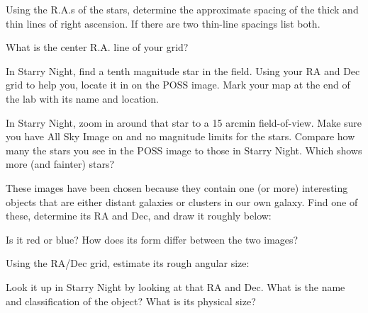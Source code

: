 \noindent Using the R.A.s of the stars, determine the approximate
spacing of the thick and thin lines of right ascension. If there are
two thin-line spacings list both.

\vspace{100pt}

\noindent What is the center R.A. line of your grid?

\vspace{100pt}

\noindent In Starry Night, find a tenth magnitude star in the
field. Using your RA and Dec grid to help you, locate it in on the
POSS image. Mark your map at the end of the lab with its name and
location.  

\noindent In Starry Night, zoom in around that star to a 15 arcmin
field-of-view.  Make sure you have All Sky Image on and no magnitude
limits for the stars. Compare how many the stars you see in the POSS
image to those in Starry Night. Which shows more (and fainter) stars?

\clearpage


\noindent These images have been chosen because they contain one (or
more) interesting objects that are either distant galaxies or clusters
in our own galaxy. Find one of these, determine its RA and Dec, and
draw it roughly below:

\vspace{100pt}

\noindent Is it red or blue? How does its form differ between the two
images? 

\vspace{80pt}

\noindent Using the RA/Dec grid, estimate its rough angular size:

\vspace{40pt}

\noindent Look it up in Starry Night by looking at that RA and
Dec. What is the name and classification of the object? What is its
physical size?


